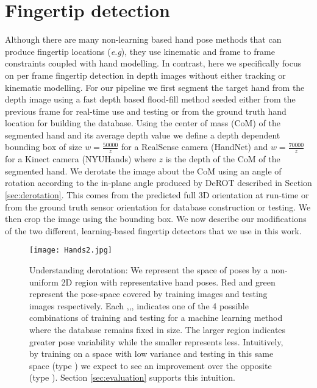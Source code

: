 \documentclass{bmvc2k}
\def\eg{\emph{e.g}\bmvaOneDot}
\newcommand{\RNum}[1]{\uppercase\expandafter{\romannumeral #1\relax}}
\begin{document}
\section{Fingertip detection} \label{sec:fingertip}
Although there are many non-learning based hand pose methods that can produce fingertip locations (\eg \cite{schmidt2014dart,oikonomidis2011markerless,MelaxKO13,BallanTGGP12}), they use kinematic and frame to frame constraints coupled with hand modelling. In contrast, here we specifically focus on per frame fingertip detection in depth images without either tracking or kinematic modelling. For our pipeline we first segment the target hand from the depth image using a fast depth based flood-fill method seeded either from the previous frame for real-time use and testing or from the ground truth hand location for building the database. Using the center of mass (CoM) of the segmented hand and its average depth value we define a depth dependent bounding box of size $w=\frac{50000}{z}$ for a RealSense camera (HandNet) and $w=\frac{70000}{z}$ for a Kinect camera (NYUHands) where $z$ is the depth of the CoM of the segmented hand. We derotate the image about the CoM using an angle of rotation according to the in-plane angle produced by DeROT described in Section \ref{sec:derotation}. This comes from the predicted full 3D orientation at run-time or from the ground truth sensor orientation for database construction or testing. We then crop the image using the bounding box. We now describe our modifications of the two different, learning-based fingertip detectors that we use in this work.
\begin{figure}[t]
\begin{center}
\texttt{[image: Hands2.jpg]}
\end{center}
   \caption{\scriptsize \color{blue} Understanding derotation: We represent the space of poses by a non-uniform 2D region with representative hand poses. Red and green represent the pose-space covered by training images and testing images respectively. Each \RNum{1},\RNum{2},\RNum{3},\RNum{4} indicates one of the 4 possible combinations of training and testing for a machine learning method where the database remains fixed in size. The larger region indicates greater pose variability while the smaller represents less. Intuitively, by training on a space with low variance and testing in this same space (type \RNum{4}) we expect to see an improvement over the opposite (type \RNum{1}). Section \ref{sec:evaluation} supports this intuition. }
\label{fig:ronnyhands}
\end{figure}
\end{document}
